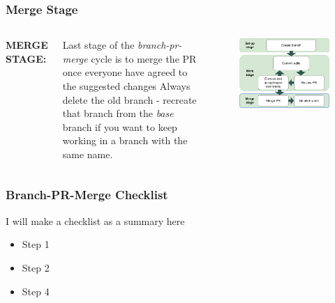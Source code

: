 \documentclass[aspectratio=169]{beamer} %
\begin{document}
\begin{frame}
	\frametitle{Merge Stage}
	\begin{columns}[c]
		
		
		\Large \textbf{MERGE STAGE:}
		\vspace{.8em}
		
		\normalsize
		Last stage of the \textit{branch-pr-merge} cycle is to merge the PR
		once everyone have agreed to the suggested changes
		\vspace{.5cm}\newline
		Always delete the old branch - recreate that branch from the \textit{base} branch
		if you want to keep working in a branch with the same name.
		
		\vspace{-.75cm}
		\begin{figure}
			\centering
			\includegraphics[width=\textwidth]{./img/branch-pr-merge-cycle-S3.png}
		\end{figure}
		
	\end{columns}
\end{frame}

\begin{frame}
	\frametitle{Branch-PR-Merge Checklist}
	I will make a checklist as a summary here
	\begin{itemize}
		\setlength\itemsep{1em}
		\item Step 1
		\item Step 2
		\item Step 4
	\end{itemize}		
\end{frame}
\end{document}

